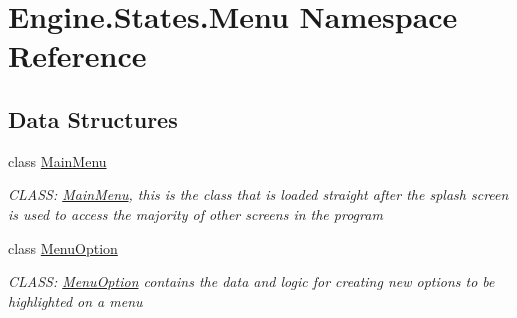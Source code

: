 \hypertarget{a00280}{}\section{Engine.\+States.\+Menu Namespace Reference}
\label{a00280}
\subsection*{Data Structures}
\begin{DoxyCompactItemize}
\item 
class \hyperlink{a00574}{Main\+Menu}
\begin{DoxyCompactList}\small\item\em C\+L\+A\+SS\+: \hyperlink{a00574}{Main\+Menu}, this is the class that is loaded straight after the splash screen is used to access the majority of other screens in the program \end{DoxyCompactList}\item 
class \hyperlink{a00582}{Menu\+Option}
\begin{DoxyCompactList}\small\item\em C\+L\+A\+SS\+: \hyperlink{a00582}{Menu\+Option} contains the data and logic for creating new options to be highlighted on a menu \end{DoxyCompactList}\end{DoxyCompactItemize}

